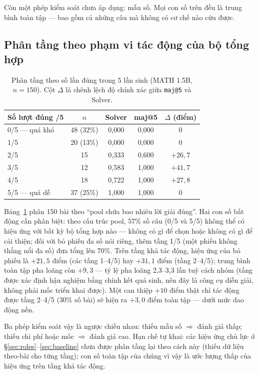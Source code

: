 \documentclass[11pt,a4paper]{article}
\begin{document}
Còn một phép kiểm soát chưa áp dụng: mẫu số. Mọi con số trên đều là trung bình toàn tập --- bao gồm cả những câu mà không có cơ chế nào cứu được.

\subsection{Phân tầng theo phạm vi tác động của bộ tổng hợp}\label{sec:denominator}

\begin{table}[h]\centering\small
\begin{tabular}{@{}l c c c c@{}}
\toprule
Số lượt đúng /5 & $n$ & Solver & maj@5 & $\Delta$ (điểm)\\
\midrule
0/5 --- quá khó & 48 (32\%) & 0,000 & 0,000 & 0\\
1/5 & 20 (13\%) & 0,000 & 0,000 & 0\\
2/5 & 15 & 0,333 & 0,600 & $+26{,}7$\\
3/5 & 12 & 0,583 & 1,000 & $+41{,}7$\\
4/5 & 18 & 0,722 & 1,000 & $+27{,}8$\\
5/5 --- quá dễ & 37 (25\%) & 1,000 & 1,000 & 0\\
\bottomrule
\end{tabular}
\caption{Phân tầng theo số lần đúng trong 5 lần sinh (MATH 1.5B, $n=150$). Cột $\Delta$ là chênh lệch độ chính xác giữa \texttt{maj@5} và Solver.}
\label{tab:strata}
\end{table}

Bảng~\ref{tab:strata} phân 150 bài theo ``pool chứa bao nhiêu lời giải đúng''. Hai con số bất động cần phân biệt: theo cấu trúc pool, 57\% số câu (0/5 và 5/5) không thể có hiệu ứng với bất kỳ bộ tổng hợp nào --- không có gì để chọn hoặc không có gì để cải thiện; đối với bỏ phiếu đa số nói riêng, thêm tầng 1/5 (một phiếu không thắng nổi đa số) đưa tổng lên 70\%. Trên tầng khả tác động, hiệu ứng của bỏ phiếu là $+21{,}5$ điểm (các tầng 1--4/5) hay $+31{,}1$ điểm (tầng 2--4/5); trung bình toàn tập pha loãng còn $+9{,}3$ --- tỷ lệ pha loãng 2,3--3,3 lần tuỳ cách nhóm (tầng được xác định hậu nghiệm bằng chính kết quả sinh, nên đây là công cụ diễn giải, không phải mốc triển khai được). Một can thiệp $+10$ điểm thật chỉ tác động được tầng 2--4/5 (30\% số bài) sẽ hiện ra $+3{,}0$ điểm toàn tập --- dưới mức dao động nền.

Ba phép kiểm soát vậy là ngược chiều nhau: thiếu mẫu số $\Rightarrow$ đánh giá thấp; thiếu chi phí hoặc mốc $\Rightarrow$ đánh giá cao. Hạn chế tự khai: các hiệu ứng chủ lực ở \S\ref{sec:roles}--\ref{sec:baseline} chưa được phân tầng lại theo cách này (thiếu dữ liệu theo-bài cho từng tầng); con số toàn tập của chúng vì vậy là ước lượng thấp của hiệu ứng trên tầng khả tác động.
\end{document}
